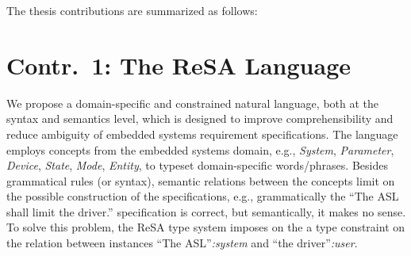 The thesis contributions are summarized as follows:
\section{Contr.~1: The ReSA Language}\label{rc_resa}
We propose a domain-specific and constrained natural language, both at the syntax and semantics level, which is designed to improve comprehensibility and reduce ambiguity of embedded systems requirement specifications. The language employs concepts from the embedded systems domain, e.g., \textit{System}, \textit{Parameter}, \textit{Device}, \textit{State}, \textit{Mode}, \textit{Entity}, to typeset domain-specific words/phrases. Besides grammatical rules (or syntax), semantic relations between the concepts limit on the possible construction of the specifications, e.g., grammatically the ``The ASL shall limit the driver.'' specification is correct, but semantically, it makes no sense. To solve this problem, the ReSA type system imposes on the a type constraint on the relation between instances ``The ASL''\textit{:system} and ``the driver''\textit{:user}.

